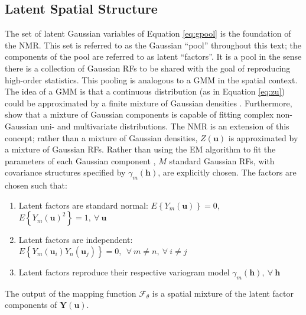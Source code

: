 

\FloatBarrier
\subsection{Latent Spatial Structure}
\label{subsec:03latent}

The set of latent Gaussian variables of Equation \ref{eq:gpool} is the foundation of the \gls{NMR}. This set is referred to as the Gaussian ``pool'' throughout this text; the components of the pool are referred to as latent ``factors''. It is a pool in the sense there is a collection of Gaussian \glspl{RF} to be shared with the goal of reproducing high-order statistics. This pooling is analogous to a \gls{GMM} in the spatial context. The idea of a \gls{GMM} is that a continuous distribution (as in Equation \ref{eq:zu}) could be approximated by a finite mixture of Gaussian densities \citep{mclachlan2019finite}. Furthermore, \cite{silva2018multivariate} show that a mixture of Gaussian components is capable of fitting complex non-Gaussian uni- and multivariate distributions. The \gls{NMR} is an extension of this concept; rather than a mixture of Gaussian densities, $Z(\mathbf{u})$ is approximated by a mixture of Gaussian \glspl{RF}. Rather than using the \gls{EM} algorithm to fit the parameters of each Gaussian component \citep{mclachlan2019finite}, $M$ standard Gaussian \glspl{RF}, with covariance structures specified by $\gamma_{m}(\mathbf{h})$, are explicitly chosen. The factors are chosen such that:
\begin{enumerate}[noitemsep]
    \item Latent factors are standard normal: $E\left\{Y_{m}(\mathbf{u})\right\}=0$, \ $E\left\{Y_{m}(\mathbf{u})^{2}\right\}=1, \ \forall \ \mathbf{u}$
    \item Latent factors are independent: $E\left\{Y_{m}(\mathbf{u}_{i})Y_{n}(\mathbf{u}_{j})\right\}=0, \ \ \forall \ m\neq n, \ \forall \ i \neq j$
    \item Latent factors reproduce their respective variogram model $\gamma_m(\mathbf{h}), \ \forall \ \mathbf{h}$
\end{enumerate}
The output of the mapping function $\mathcal{F}_{\theta}$ is a spatial mixture of the latent factor components of $\mathbf{Y}(\mathbf{u})$.


